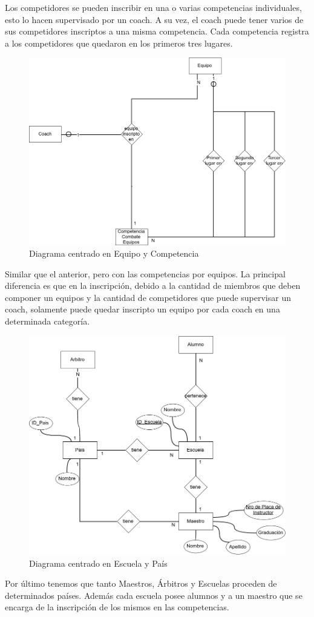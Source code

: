 Los competidores se pueden inscribir en una o varias competencias individuales, esto lo hacen supervisado por un coach. A su
vez, el coach puede tener varios de sus competidores inscriptos a una misma competencia. Cada competencia registra a los
competidores que quedaron en los primeros tres lugares.

\begin{figure}[H]
  \centering
    \includegraphics[scale=0.5]{imagenes/EquipoCompetencia.png}
  \caption{Diagrama centrado en Equipo y Competencia}
\end{figure}

Similar que el anterior, pero con las competencias por equipos. La principal diferencia es que en la inscripción, debido a
la cantidad de miembros que deben componer un equipos y la cantidad de competidores que puede supervisar un coach, solamente puede quedar inscripto un equipo por cada
coach en una determinada categoría.

\begin{figure}[H]
  \centering
    \includegraphics[scale=0.5]{imagenes/EscuelaPais.png}
  \caption{Diagrama centrado en Escuela y País}
\end{figure}

Por último tenemos que tanto Maestros, Árbitros y Escuelas proceden de determinados países. Además cada
escuela posee alumnos y a un maestro que se encarga de la inscripción de los mismos en las competencias.
